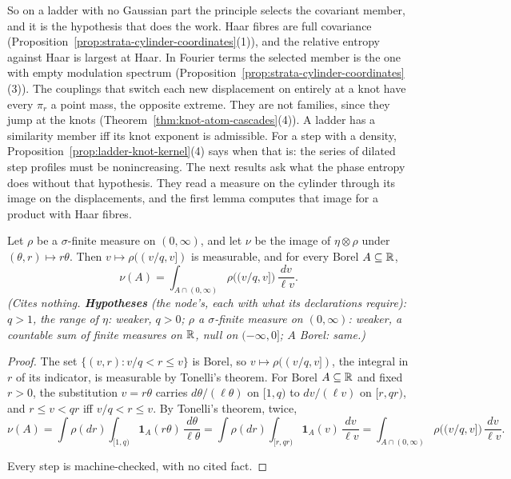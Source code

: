 So on a ladder with no Gaussian part the principle selects the covariant member, and it is the
hypothesis that does the work. Haar fibres are full covariance
(Proposition~\ref{prop:strata-cylinder-coordinates}(1)), and the relative entropy against Haar is
largest at Haar. In Fourier terms the selected member is the one with empty modulation spectrum
(Proposition~\ref{prop:strata-cylinder-coordinates}(3)). The couplings that switch each new
displacement on entirely at a knot have every $\pi_r$ a point mass, the opposite extreme. They are
not families, since they jump at the knots (Theorem~\ref{thm:knot-atom-cascades}(4)). A ladder has
a similarity member iff its knot exponent is admissible. For a step with a \Levy{} density,
Proposition~\ref{prop:ladder-knot-kernel}(4) says when that is: the series of dilated step profiles
must be nonincreasing. The next results ask what the phase entropy does without that hypothesis.
They read a measure on the cylinder through its image on the displacements, and the first lemma
computes that image for a product with Haar fibres.

\begin{lemma}
\label{lem:haar-smearing-density}
\leanok
{}
Let $\rho$ be a $\sigma$-finite measure on $(0,\infty)$, and let $\nu$ be the image of
$\eta \otimes \rho$ under $(\theta, r) \mapsto r\theta$. Then $v \mapsto \rho((v/q, v])$ is
measurable, and for every Borel $A \subseteq \mathbb{R}$,
\[
  \nu(A) = \int_{A \cap (0,\infty)}\rho\bigl((v/q, v]\bigr)\,\frac{dv}{\ell v} .
\]
\statusT\quad\emph{(Cites nothing. \textbf{Hypotheses} (the node's, each with what its declarations
require): $q > 1$, the range of $\eta$: weaker, $q > 0$; $\rho$ a $\sigma$-finite measure on
$(0,\infty)$: weaker, a countable sum of finite measures on $\mathbb{R}$, null on $(-\infty,0]$; $A$
Borel: same.)}
\end{lemma}

\begin{proof}
\leanok
The set $\{(v, r) : v/q < r \le v\}$ is Borel, so $v \mapsto \rho((v/q, v])$, the integral in $r$ of
its indicator, is measurable by Tonelli's theorem. For Borel $A \subseteq \mathbb{R}$ and fixed $r > 0$,
the substitution $v = r\theta$ carries $d\theta/(\ell\theta)$ on $[1,q)$ to $dv/(\ell v)$ on
$[r,qr)$, and $r \le v < qr$ iff $v/q < r \le v$. By Tonelli's theorem, twice,
\[
  \nu(A) = \int\rho(dr)\int_{[1,q)}\mathbf 1_A(r\theta)\,\frac{d\theta}{\ell\theta}
  = \int\rho(dr)\int_{[r,qr)}\mathbf 1_A(v)\,\frac{dv}{\ell v}
  = \int_{A \cap (0,\infty)}\rho\bigl((v/q, v]\bigr)\,\frac{dv}{\ell v}.
\]

Every step is machine-checked, with no cited fact.
\end{proof}

